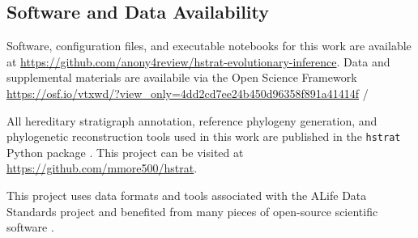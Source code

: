 \subsection{Software and Data Availability}

Software, configuration files, and executable notebooks for this work are available at \url{https://github.com/anony4review/hstrat-evolutionary-inference}.
Data and supplemental materials are availabile via the Open Science Framework \url{https://osf.io/vtxwd/?view_only=4dd2cd7ee24b450d96358f891a41414f} \citep{foster2017open}/

All hereditary stratigraph annotation, reference phylogeny generation, and phylogenetic reconstruction tools used in this work are published in the \texttt{hstrat} Python package  \citep{moreno2022hstrat}. 
This project can be visited at \url{https://github.com/mmore500/hstrat}.

This project uses data formats and tools associated with the ALife Data Standards project \citep{lalejini2019data} and benefited from many pieces of open-source scientific software \cite{ofria2020empirical,sand2014tqdist,2020SciPy-NMeth,harris2020array,reback2020pandas,mckinney-proc-scipy-2010,sukumaran2010dendropy,cock2009biopython}.





